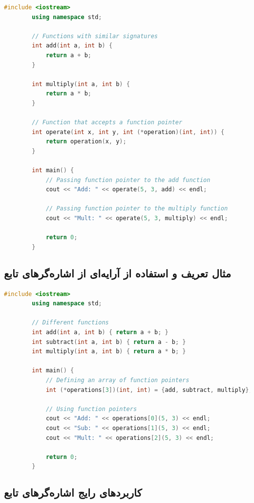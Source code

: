 \documentclass[12pt, a4paper]{report}
\begin{document}
\begin{LTR} %
	\begin{lstlisting}[language=C++, breaklines=true]
		#include <iostream>
		using namespace std;
		
		// Functions with similar signatures
		int add(int a, int b) {
			return a + b;
		}
		
		int multiply(int a, int b) {
			return a * b;
		}
		
		// Function that accepts a function pointer
		int operate(int x, int y, int (*operation)(int, int)) {
			return operation(x, y);
		}
		
		int main() {
			// Passing function pointer to the add function
			cout << "Add: " << operate(5, 3, add) << endl;
			
			// Passing function pointer to the multiply function
			cout << "Mult: " << operate(5, 3, multiply) << endl;
			
			return 0;
		}
	\end{lstlisting}
\end{LTR}

\subsection{مثال تعریف و استفاده از آرایه‌ای از اشاره‌گرهای تابع}


\begin{LTR} %
	\begin{lstlisting}[language=C++, breaklines=true]
		#include <iostream>
		using namespace std;
		
		// Different functions
		int add(int a, int b) { return a + b; }
		int subtract(int a, int b) { return a - b; }
		int multiply(int a, int b) { return a * b; }
		
		int main() {
			// Defining an array of function pointers
			int (*operations[3])(int, int) = {add, subtract, multiply};
			
			// Using function pointers
			cout << "Add: " << operations[0](5, 3) << endl;
			cout << "Sub: " << operations[1](5, 3) << endl;
			cout << "Mult: " << operations[2](5, 3) << endl;
			
			return 0;
		}
	\end{lstlisting}
\end{LTR}


\subsection{کاربردهای رایج اشاره‌گرهای تابع}
\end{document}
